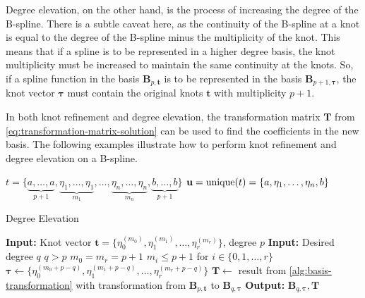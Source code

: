 Degree elevation, on the other hand, is the process of increasing the degree of the B-spline. There is a subtle caveat here, as the continuity of the B-spline at a knot is equal to the degree of the B-spline minus the multiplicity of the knot. This means that if a spline is to be represented in a higher degree basis, the knot multiplicity must be increased to maintain the same continuity at the knots. So, if a spline function in the basis $\mathbf B_{p,\mathbf t}$ is to be represented in the basis $\mathbf B_{p+1,\boldsymbol \tau}$, the knot vector $\boldsymbol \tau$ must contain the original knots $\mathbf t$ with multiplicity $p+1$.

In both knot refinement and degree elevation, the transformation matrix $\mathbf T$ from \cref{eq:transformation-matrix-solution} can be used to find the coefficients in the new basis. The following examples illustrate how to perform knot refinement and degree elevation on a B-spline.

$t = \{\underbrace{a, \dots, a}_{p+1}, \underbrace{\eta_1, \dots, \eta_1}_{m_1}, \dots, \underbrace{\eta_{n}, \dots, \eta_{n}}_{m_n}, \underbrace{b, \dots, b}_{p+1}\}$
$\mathbf u = \operatorname{unique}(t) = \{a, \eta_1, \dots, \eta_n, b\}$

\begin{algorithm}
    \caption{Degree Elevation}\label{alg:degree-elevation}
    \begin{algorithmic}[1]
        \State \textbf{Input:} Knot vector $\mathbf t = \{\eta_0^{(m_0)}, \eta_1^{(m_1)}, \dots, \eta_r^{(m_r)}\}$, degree $p$
        \State \textbf{Input:} Desired degree $q$
        \Ensure $q > p$
        \Ensure $m_0 = m_r = p+1$
        \Ensure $m_i \leq p+1$ for $i \in \{0,1,\ldots,r\}$
        \State $\boldsymbol\tau \gets \{\eta_0^{(m_0+p-q)}, \eta_1^{(m_1+p-q)}, \dots, \eta_r^{(m_r+p-q)}\}$
        \State $\mathbf T \gets $ result from \cref{alg:basis-transformation} with transformation from $\mathbf B_{p,\mathbf t}$ to $\mathbf B_{q,\boldsymbol \tau}$
        \State \textbf{Output:} $\mathbf B_{q, \boldsymbol \tau}, \mathbf T$
    \end{algorithmic}
\end{algorithm}

